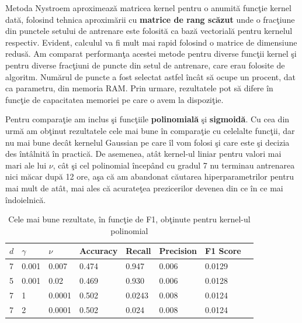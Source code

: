 Metoda Nystroem aproximează matricea kernel pentru o anumită funcţie kernel dată,
folosind tehnica aproximării cu \textbf{matrice de 
rang scăzut} unde o fracţiune din punctele setului de antrenare este folosită 
ca bază vectorială pentru kernelul respectiv. Evident, calculul va fi mult mai 
rapid folosind o matrice de dimensiune redusă. Am comparat performanţa acestei metode 
pentru diverse funcţii kernel şi pentru diverse fracţiuni de puncte din setul de 
antrenare, care erau folosite de algoritm. Numărul de puncte a fost selectat astfel 
încât să ocupe un procent, dat ca parametru, din memoria RAM. Prin urmare, rezultatele 
pot să difere în funcţie de capacitatea memoriei pe care o avem la dispoziţie.

Pentru comparaţie am inclus şi funcţiile \textbf{polinomială} şi 
\textbf{sigmoidă}. Cu cea din urmă am obţinut rezultatele cele mai bune în comparaţie
cu celelalte funcţii, dar  
nu mai bune decât kernelul Gaussian pe care îl vom folosi şi care 
este şi decizia des întâlnită în practică. De asemenea, atât kernel-ul liniar pentru valori mai mari
ale lui $\nu$, 
cât şi cel polinomial începând cu gradul 7 nu terminau antrenarea nici măcar 
după 12 ore, aşa că am abandonat căutarea hiperparametrilor pentru mai mult 
de atât, mai ales că acurateţea prezicerilor devenea din ce în ce mai îndoielnică.

\begin{table}[H]
    \centering
    \begin{tabularx}{\textwidth}{
        |X
        |X
        |X
        |X
        |X
        |X
        |X
        |X|
    }
    \hline
    $d$ & $\gamma$ & $\nu$ & {Accuracy} & {Recall} & {Precision} & {F1 Score} \\
    \hline
    \rowcolor{gray!20} 7 & 0.001 & 0.007 & 0.474	& 0.947 & 0.006	& 0.0129    \\
    5 & 0.001 & 0.02 & 0.469	& 0.930	& 0.006	& 0.0128 \\
    \rowcolor{gray!20} 7 & 1 & 0.0001	& 0.502	& 0.0243	& 0.008	& 0.0124   \\
    7 & 2 & 0.0001 & 0.502	& 0.024	& 0.008	& 0.0124 \\
    \hline
  \end{tabularx}
  \caption{Cele mai bune rezultate, în funcţie de F1, obţinute pentru kernel-ul polinomial}
\end{table}

